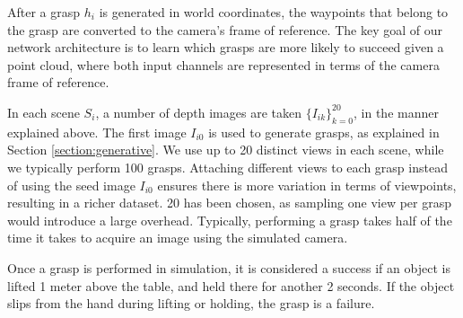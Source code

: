 After a grasp $h_i$ is generated in world coordinates, the waypoints that belong to the grasp are converted to the camera's frame of reference. The key goal of our network architecture is to learn which grasps are more likely to succeed given a point cloud, where both input channels are represented in terms of the camera frame of reference. %

In each scene $S_i$, a number of depth images are taken $\{I_{ik}\}_{k=0}^20$, in the manner explained above. The first image $I_{i0}$ is used to generate grasps, as explained in Section \ref{section:generative}. We use up to 20 distinct views in each scene, while we typically perform 100 grasps. Attaching different views to each grasp instead of using the seed image $I_{i0}$ ensures there is more variation in terms of viewpoints, resulting in a richer dataset. 20 has been chosen, as sampling one view per grasp would introduce a large overhead. Typically, performing a grasp takes half of the time it takes to acquire an image using the simulated camera.

Once a grasp is performed in simulation, it is considered a success if an object is lifted 1 meter above the table, and held there for another 2 seconds. If the object slips from the hand during lifting or holding, the grasp is a failure. 

